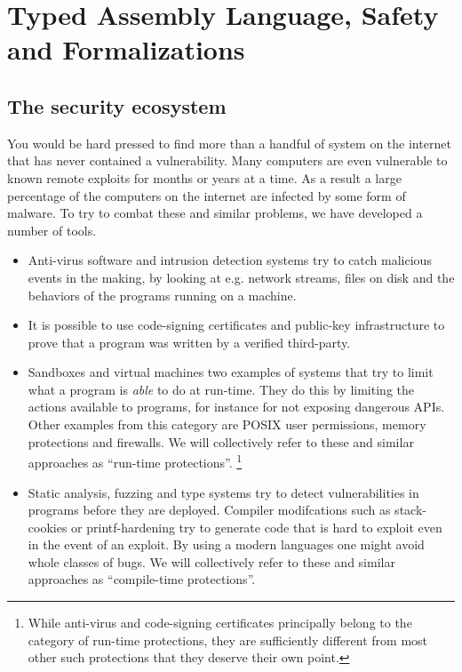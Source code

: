 \chapter{Typed Assembly Language, Safety and Formalizations}
\label{chap:introduction}

\section{The security ecosystem}
You would be hard pressed to find more than a handful of system on the internet
that has never contained a vulnerability. Many computers are even vulnerable to
known remote exploits for months or years at a time. As a result a large
percentage of the computers on the internet are infected by some form of
malware. To try to combat these and similar problems, we have developed a number
of tools.

\begin{itemize}
\item Anti-virus software and intrusion detection systems try to catch malicious
  events in the making, by looking at e.g. network streams, files on disk and
  the behaviors of the programs running on a machine.
\item It is possible to use code-signing certificates and public-key
  infrastructure to prove that a program was written by a verified third-party.
\item Sandboxes and virtual machines two examples of systems that try to limit
  what a program is \emph{able} to do at run-time. They do this by limiting the
  actions available to programs, for instance for not exposing dangerous
  APIs. Other examples from this category are POSIX user permissions, memory
  protections and firewalls. We will collectively refer to these and similar
  approaches as ``run-time protections''.  \footnote{ While anti-virus and
    code-signing certificates principally belong to the category of run-time
    protections, they are sufficiently different from most other such
    protections that they deserve their own point.  }
\item Static analysis, fuzzing and type systems try to detect vulnerabilities in
  programs before they are deployed. Compiler modifcations such as stack-cookies
  or printf-hardening try to generate code that is hard to exploit even in the
  event of an exploit. By using a modern languages one might avoid whole classes
  of bugs. We will collectively refer to these and similar approaches as
  ``compile-time protections''.
\end{itemize}

